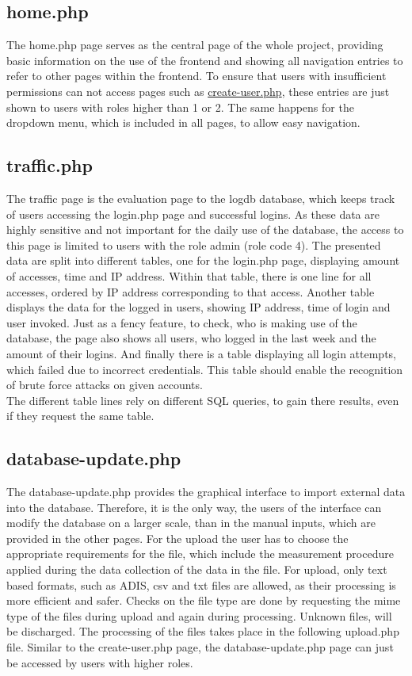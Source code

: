
\subsection{home.php}

The home.php page serves as the central page of the whole project, providing basic information on the use of the frontend and showing all navigation entries to refer to other pages 
within the frontend. To ensure that users with insufficient permissions can not access pages such as \hyperref[create-user.php]{create-user.php}, these entries are just shown to users with roles 
higher than 1 or 2. The same happens for the dropdown menu, which is included in all pages, to allow easy navigation. 

\subsection{traffic.php}
The traffic page is the evaluation page to the logdb database, which keeps track of users accessing the login.php page and successful logins. As these data are highly sensitive and 
not important for the daily use of the database, the access to this page is limited to users with the role admin (role code 4). The presented data are split into different tables, 
one for the login.php page, displaying amount of accesses, time and IP address. Within that table, there is one line for all accesses, ordered by IP address corresponding to that access. 
Another table displays the data for the logged in users, showing IP address, time of login and user invoked. Just as a fency feature, to check, who is making use of the database, the page also 
shows all users, who logged in the last week and the amount of their logins. And finally there is a table displaying all login attempts, which failed due to 
incorrect credentials. This table should enable the recognition of brute force attacks on given accounts.\\
The different table lines rely on different SQL queries, to gain there results, even if they request the same table.

\subsection{database-update.php}
The database-update.php provides the graphical interface to import external data into the database. Therefore, it is the only way, the users of the interface can modify the database 
on a larger scale, than in the manual inputs, which are provided in the other pages. For the upload the user has to choose the appropriate requirements for the file, which include the 
measurement procedure applied during the data collection of the data in the file. For upload, only text based formats, such as ADIS, csv and txt files are allowed, as their processing is more 
efficient and safer. Checks on the file type are done by requesting the mime type of the files during upload and again during processing. Unknown files, will be discharged. 
The processing of the files takes place in the following upload.php file. Similar to the create-user.php page, the database-update.php page can just be accessed by users with higher roles. 

